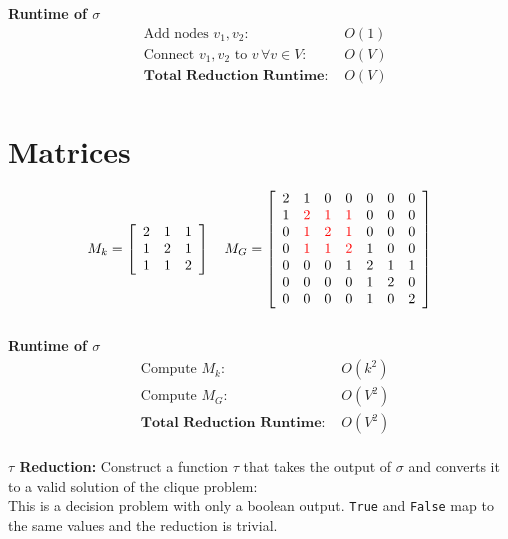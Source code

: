 \documentclass[11pt]{article}
\begin{document}
\textbf{Runtime of $\sigma$}
\begin{align*}
&\text{Add nodes $v_1,v_2$: } &O(1)\\ 
&\text{Connect $v_1,v_2$ to $v\, \forall v \in V$: } &O(V)\\ 
&\textbf{Total Reduction Runtime: } &O(V)\\
\end{align*}

\section{Matrices}
 
\[M_k = 
\left[ {\begin{array}{*{3}c}
   2 & 1 & 1  \\
   1 & 2 & 1 \\
   1 & 1 & 2  \\
 \end{array} } \right]
\quad
 M_G = 
\left[ {\begin{array}{*{7}c}
   2 & 1 & 0 & 0 & 0 & 0 & 0  \\
   1 & \textcolor{red}2 & \textcolor{red}1 & \textcolor{red}1 & 0 & 0 & 0  \\
   0 & \textcolor{red}1 & \textcolor{red}2 & \textcolor{red}1 & 0 & 0 & 0  \\
   0 & \textcolor{red}1 & \textcolor{red}1 & \textcolor{red}2 & 1 & 0 & 0  \\
   0 & 0 & 0 & 1 & 2 & 1 & 1  \\
   0 & 0 & 0 & 0 & 1 & 2 & 0  \\
   0 & 0 & 0 & 0 & 1 & 0 & 2  \\
 \end{array} } \right]
\]\\


\textbf{Runtime of $\sigma$}
\begin{align*}
&\text{Compute $M_k$: } &O(k^2)\\ 
&\text{Compute $M_G$: } &O(V^2)\\ 
&\textbf{Total Reduction Runtime: } &O(V^2)\\
\end{align*}


\textbf{$\tau$ Reduction:}
Construct a function $\tau$ that takes the output of $\sigma$ and converts it to a valid solution of the clique problem:\\

This is a decision problem with only a boolean output. \texttt{True} and \texttt{False} map to the same values and the reduction is trivial.\\
\end{document}
